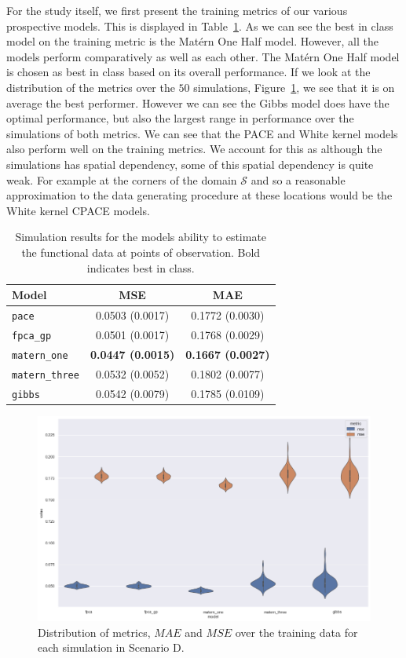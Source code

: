 For the study itself, we first present the training metrics of our various prospective models. 
This is displayed in Table~\ref{tab:train_D}.
As we can see the best in class model on the training metric is the Mat\'ern One Half model. 
However, all the models perform comparatively as well as each other.
The Mat\'ern One Half model is chosen as best in class based on its overall performance.
If we look at the distribution of the metrics over the $50$ simulations, Figure~\ref{fig:train_D_dist}, we see that it is on average the best performer. 
However we can see the Gibbs model  does have the optimal performance, but also the largest range in performance over the simulations of both metrics.
We can see that the PACE and White kernel models also perform well on the training metrics.
We account for this as although the simulations has spatial dependency, some of this spatial dependency is quite weak.
For example at the corners of the domain $\mathcal{S}$ and so a reasonable approximation to the data generating procedure at these locations would be the White kernel CPACE models.


\begin{table}[b]
	\caption[Simulation results for Scenario D on observed data]{Simulation results for the models ability to estimate the functional data at points of observation. Bold indicates best in class.}
	\centering
	\label{tab:train_D}
	\begin{tabular}{lcc}
		\toprule
		\textbf{Model} & \textbf{MSE} & \textbf{MAE} \\
		\midrule
		\verb*|pace| & 0.0503 (0.0017)& 0.1772 (0.0030)\\
		\verb*|fpca_gp| & 0.0501 (0.0017) & 0.1768	(0.0029) \\
		\verb*|matern_one| & \textbf{0.0447	(0.0015)} & \textbf{0.1667 (0.0027)} \\
		\verb*|matern_three| & 0.0532 (0.0052)& 0.1802 (0.0077) \\
		\verb*|gibbs| & 0.0542 (0.0079) & 0.1785 (0.0109)\\
		\bottomrule
	\end{tabular}
\end{table}

\begin{figure}
	\centering
	\includegraphics[width=\textwidth]{train_D_dist}
	\caption{Distribution of metrics, $MAE$ and $MSE$ over the training data for each simulation in Scenario D.}
	\label{fig:train_D_dist}
\end{figure}

